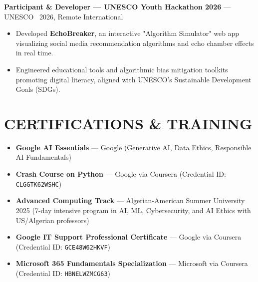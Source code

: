 \documentclass[10pt, letterpaper]{article}
\newcommand{\entry}[4]{%
  \noindent\textbf{#1} --- #3 \textbar\ #2, #4\par
  \vspace{2pt}
}
\newcommand{\resumeItem}[1]{\item #1}
\begin{document}
\entry{Participant \& Developer --- UNESCO Youth Hackathon 2026}{2026}{UNESCO}{Remote International}
\begin{itemize}
  \resumeItem{Developed \textbf{EchoBreaker}, an interactive "Algorithm Simulator" web app visualizing social media recommendation algorithms and echo chamber effects in real time.}
  \resumeItem{Engineered educational tools and algorithmic bias mitigation toolkits promoting digital literacy, aligned with UNESCO's Sustainable Development Goals (SDGs).}
\end{itemize}

\section{CERTIFICATIONS \& TRAINING}
\begin{itemize}
  \resumeItem{\textbf{Google AI Essentials} --- Google (Generative AI, Data Ethics, Responsible AI Fundamentals)}
  \resumeItem{\textbf{Crash Course on Python} --- Google via Coursera (Credential ID: \texttt{CLGGTK62WSHC})}
  \resumeItem{\textbf{Advanced Computing Track} --- Algerian-American Summer University 2025 (7-day intensive program in AI, ML, Cybersecurity, and AI Ethics with US/Algerian professors)}
  \resumeItem{\textbf{Google IT Support Professional Certificate} --- Google via Coursera (Credential ID: \texttt{GCE48W62HKVF})}
  \resumeItem{\textbf{Microsoft 365 Fundamentals Specialization} --- Microsoft via Coursera (Credential ID: \texttt{HBNELWZMCG63})}
\end{itemize}
\end{document}
